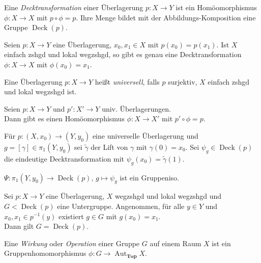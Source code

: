 \documentclass{cheat-sheet}
\DeclareMathOperator{\Aut}{Aut} %
\DeclareMathOperator{\Deck}{Deck} %
\begin{document}
\begin{defn}
  Eine \emph{Decktransformation} einer Überlagerung $p : X \to Y$ ist ein Homöomorphismus $\phi : X \to X$ mit $p \circ \phi = p$. Ihre Menge bildet mit der Abbildungs-Komposition eine Gruppe $\Deck(p)$.
\end{defn}

\begin{kor}
  Seien $p : X \to Y$ eine Überlagerung, $x_0, x_1 \in X$ mit $p(x_0) = p(x_1)$. Ist $X$ einfach zshgd und lokal wegzshgd, so gibt es genau eine Decktransformation $\phi : X \to X$ mit $\phi(x_0) = x_1$.
\end{kor}


\begin{defn}
  Eine Überlagerung $p : X \to Y$ heißt \emph{universell}, falls $p$ surjektiv, $X$ einfach zshgd und lokal wegzshgd ist.
\end{defn}

\begin{prop}
  Seien $p : X \to Y$ und $p' : X' \to Y$ univ. Überlagerungen. \\
  Dann gibt es einen Homöomorphismus $\phi : X \to X'$ mit $p' \circ \phi = p$.
\end{prop}

Für $p : (X, x_0) \to (Y, y_0)$ eine universelle Überlagerung und $g = [\gamma] \in \pi_1(Y, y_0)$ sei $\tilde{\gamma}$ der Lift von $\gamma$ mit $\gamma(0) = x_0$. Sei $\psi_g \in \Deck(p)$ die eindeutige Decktransformation mit $\psi_g(x_0) = \tilde{\gamma}(1)$.

\begin{prop}
  $\Psi : \pi_1(Y, y_0) \to \Deck(p)$, $g \mapsto \psi_g$ ist ein Gruppeniso.
\end{prop}


\begin{prop}
  Sei $p : X \to Y$ eine Überlagerung, $X$ wegzshgd und lokal wegzshgd und $G < \Deck(p)$ eine Untergruppe. Angenommen, für alle $y \in Y$ und $x_0, x_1 \in p^{-1}(y)$ existiert $g \in G$ mit $g(x_0) = x_1$. \\
  Dann gilt $G = \Deck(p)$.
\end{prop}

\begin{defn}
  Eine \emph{Wirkung} oder \emph{Operation} einer Gruppe $G$ auf einem Raum $X$ ist ein Gruppenhomomorphismus $\phi : G \to \Aut_{\mathbf{Top}}{X}$.
\end{defn}
\end{document}
